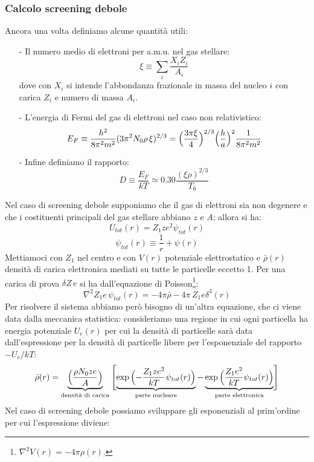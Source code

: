\subsubsection{Calcolo screening debole}
Ancora una volta definiamo alcune quantità utili:
\begin{itemize}
    \item[-] Il numero medio di elettroni per a.m.u. nel gas stellare: 
    $$\xi \equiv \sum_i \frac{X_iZ_i}{A_i}$$
    dove con $X_i$ si intende l'abbondanza frazionale in massa del nucleo $i$ con carica $Z_i$ e numero di massa $A_i$.
    \item[-] L'energia di Fermi del gas di elettroni nel caso non relativistico:
    $$E_F \equiv \frac{h^2}{8\pi^2 m^2}(3\pi^2N_0\rho\, \xi)^{2/3} = \Bigl ( \frac{3\pi\xi}{4} \Bigr )^{2/3} \Bigl ( \frac{h}{a} \Bigr )^2 \frac{1}{8\pi^2m^2}$$
    \item[-] Infine definiamo il rapporto:
    $$D\equiv \frac{E_F}{kT} \simeq 0.30 \frac{(\xi\rho)^{2/3}}{T_6}$$
\end{itemize}
Nel caso di screening debole supponiamo che il gas di elettroni sia non degenere e che i costituenti principali del gas stellare abbiano $z$ e $A$; allora si ha:
$$U_{tot}(r) = Z_1 z e^2 \psi_{tot}(r)$$
$$\psi_{tot}(r) \equiv \frac{1}{r} + \psi(r)$$
Mettiamoci con $Z_1$ nel centro e con $V(r)$ potenziale elettrostatico e $\bar{\rho}(r)$ densità di carica elettronica mediati su tutte le particelle eccetto 1. Per una carica di prova $\delta Z\,e$ si ha dall'equazione di Poisson\footnote{$\nabla^2 V(r) = -4\pi{\rho}(r)$.}:
\begin{equation}\label{0329_poisson}
    \nabla^2 Z_1 e\,\psi_{tot}(r) = -4\pi\bar{\rho} -4\pi \,Z_1 e\delta^{3}(r)
\end{equation}
Per risolvere il sistema abbiamo però bisogno di un'altra equazione, che ci viene data dalla meccanica statistica:
consideriamo una regione in cui ogni particella ha energia potenziale $U_e(r)$ per cui la densità di particelle sarà data dall'espressione per la densità di particelle libere per l'esponenziale del rapporto $-U_e/kT$:
\begin{equation*}
    \bar{\rho} (r) = \underbrace{\Bigl ( \frac{\rho N_0ze}{A} \Bigr )}_\text{densità di carica}\:\Biggl [ \underbrace{\exp{\Bigl ( -\frac{Z_1ze^2}{kT}\psi_{tot}(r) \Bigr )}}_\text{parte nucleare} - \underbrace{\exp{\Bigl ( \frac{Z_1e^2}{kT}\psi_{tot}(r) \Bigr )}}_\text{parte elettronica} \Biggr ]
\end{equation*}
Nel caso di screening debole possiamo sviluppare gli esponenziali al prim'ordine per cui l'espressione diviene:
